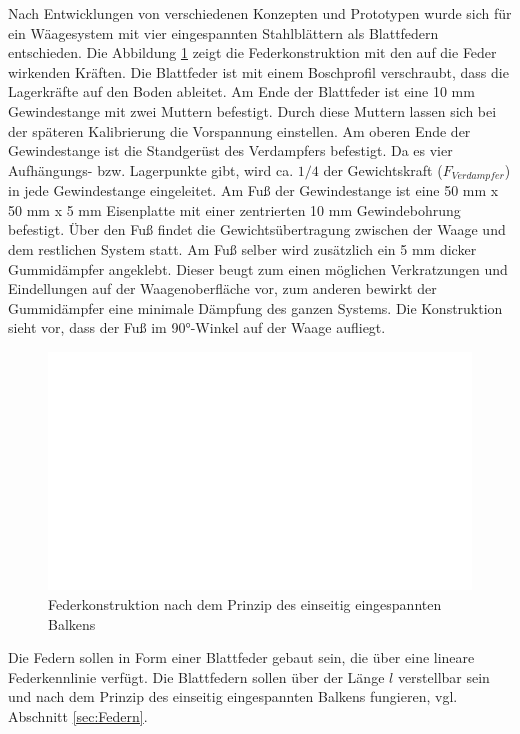 Nach Entwicklungen von verschiedenen Konzepten und Prototypen wurde sich für ein Wäagesystem mit vier eingespannten Stahlblättern als Blattfedern entschieden.  Die Abbildung \ref{fig:Feder} zeigt die Federkonstruktion mit den auf die Feder wirkenden Kräften. Die Blattfeder ist mit einem Boschprofil verschraubt, dass die Lagerkräfte auf den Boden ableitet. Am Ende der Blattfeder ist eine 10 mm Gewindestange mit zwei Muttern befestigt. Durch diese Muttern lassen sich bei der späteren Kalibrierung die Vorspannung einstellen. Am oberen Ende der Gewindestange ist die Standgerüst des Verdampfers befestigt. Da es vier Aufhängungs- bzw. Lagerpunkte gibt, wird ca. $1/4$ der Gewichtskraft ($F_{Verdampfer}$) in jede Gewindestange eingeleitet. Am Fuß der Gewindestange ist eine 50 mm x 50 mm x 5 mm Eisenplatte mit einer zentrierten 10 mm Gewindebohrung befestigt. Über den Fuß findet die Gewichtsübertragung zwischen der Waage und dem restlichen System statt. Am Fuß selber wird zusätzlich ein 5 mm dicker Gummidämpfer angeklebt. Dieser beugt zum einen möglichen Verkratzungen und Eindellungen auf der Waagenoberfläche vor, zum anderen bewirkt der Gummidämpfer eine minimale Dämpfung des ganzen Systems. Die Konstruktion sieht vor, dass der Fuß im 90$°$-Winkel auf der Waage aufliegt. 

\begin{figure}
\centering		\includegraphics[page=7,width=1.10\textwidth]{Pictures/Feder.pdf}
\caption{Federkonstruktion nach dem Prinzip des einseitig eingespannten Balkens}
\label{fig:Feder}
\end{figure}






Die Federn sollen in Form einer Blattfeder gebaut sein, die über eine lineare Federkennlinie verfügt. Die Blattfedern sollen über der Länge $l$ verstellbar sein und nach dem Prinzip des einseitig eingespannten Balkens fungieren, vgl. Abschnitt \ref{sec:Federn}. 

